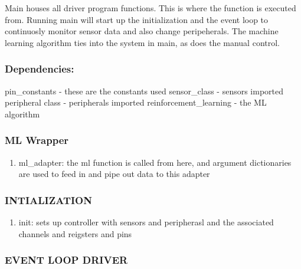 \documentclass[
]{article}
\providecommand{\tightlist}{%
  \setlength{\itemsep}{0pt}\setlength{\parskip}{0pt}}
\begin{document}
Main houses all driver program functions. This is where the function is
executed from. Running main will start up the initialization and the
event loop to continuosly monitor sensor data and also change
peripeherals. The machine learning algorithm ties into the system in
main, as does the manual control.

\hypertarget{dependencies-3}{%
\subsubsection{Dependencies:}\label{dependencies-3}}

pin\_constants - these are the constants used sensor\_class - sensors
imported peripheral class - peripherals imported reinforcement\_learning
- the ML algorithm

\hypertarget{ml-wrapper}{%
\subsubsection{ML Wrapper}\label{ml-wrapper}}

\begin{enumerate}
\def\labelenumi{\arabic{enumi}.}
\tightlist
\item
  ml\_adapter: the ml function is called from here, and argument
  dictionaries are used to feed in and pipe out data to this adapter
\end{enumerate}

\hypertarget{intialization}{%
\subsubsection{INTIALIZATION}\label{intialization}}

\begin{enumerate}
\def\labelenumi{\arabic{enumi}.}
\tightlist
\item
  init: sets up controller with sensors and peripherasl and the
  associated channels and reigsters and pins
\end{enumerate}

\hypertarget{event-loop-driver}{%
\subsubsection{EVENT LOOP DRIVER}\label{event-loop-driver}}
\end{document}
